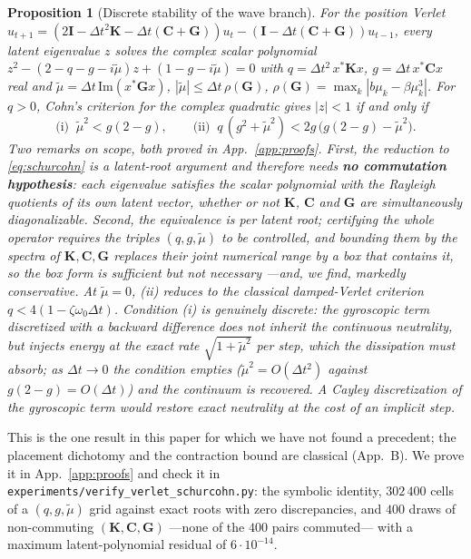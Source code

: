 \documentclass{article}
\newtheorem{proposition}{Proposition}
\begin{document}
\begin{proposition}[Discrete stability of the wave branch]
\label{prop:verlet}
For the position Verlet
$u_{t+1}=(2\mathbf{I}-\Delta t^2\mathbf{K}-\Delta t(\mathbf{C}+\mathbf{G}))u_t
-(\mathbf{I}-\Delta t(\mathbf{C}+\mathbf{G}))u_{t-1}$, every latent eigenvalue
$z$ solves the complex scalar polynomial
$z^2-(2-q-g-i\tilde\mu)z+(1-g-i\tilde\mu)=0$ with
$q=\Delta t^2\,x^*\mathbf{K}x$, $g=\Delta t\,x^*\mathbf{C}x$ real and
$\tilde\mu=\Delta t\,\mathrm{Im}(x^*\mathbf{G}x)$,
$|\tilde\mu|\le\Delta t\,\rho(\mathbf{G})$,
$\rho(\mathbf{G})=\max_k|b\mu_k-\beta\mu_k^3|$. For $q>0$, Cohn's criterion
for the complex quadratic gives $|z|<1$ \emph{if and only if}
\begin{equation}\label{eq:schurcohn}
\text{(i)}\;\;\tilde\mu^2< g(2-g),\qquad
\text{(ii)}\;\;q\,(g^2+\tilde\mu^2)< 2g\,\big(g(2-g)-\tilde\mu^2\big).
\end{equation}
Two remarks on scope, both proved in App.~\ref{app:proofs}. First, the
reduction to \eqref{eq:schurcohn} is a \emph{latent-root} argument and
therefore needs \textbf{no commutation hypothesis}: each eigenvalue satisfies
the scalar polynomial with the Rayleigh quotients of its own latent vector,
whether or not $\mathbf{K}$, $\mathbf{C}$ and $\mathbf{G}$ are simultaneously
diagonalizable. Second, the equivalence is per latent root; certifying the
whole operator requires the triples $(q,g,\tilde\mu)$ to be controlled, and
bounding them by the spectra of $\mathbf{K},\mathbf{C},\mathbf{G}$ replaces
their joint numerical range by a \emph{box} that contains it, so the box form
is sufficient but not necessary ---and, we find, markedly conservative.
At $\tilde\mu=0$, (ii) reduces to the classical damped-Verlet criterion
$q<4(1-\zeta\omega_0\Delta t)$. Condition (i) is \emph{genuinely discrete}: the
gyroscopic term discretized with a backward difference does not inherit the
continuous neutrality, but injects energy at the exact rate
$\sqrt{1+\tilde\mu^2}$ per step, which the dissipation must absorb; as
$\Delta t\to0$ the condition empties ($\tilde\mu^2=O(\Delta t^2)$ against
$g(2-g)=O(\Delta t)$) and the continuum is recovered. A Cayley discretization of
the gyroscopic term \citep{iserles2000lie} would restore exact neutrality at the
cost of an implicit step.
\end{proposition}

This is the one result in this paper for which we have not found a precedent;
the placement dichotomy and the contraction bound are classical (App.~B). We
prove it in App.~\ref{app:proofs} and check it in
\texttt{experiments/verify\_verlet\_schurcohn.py}: the symbolic identity, $302\,400$ cells
of a $(q,g,\tilde\mu)$ grid against exact roots with zero discrepancies, and
$400$ draws of non-commuting $(\mathbf{K},\mathbf{C},\mathbf{G})$ ---none of
the $400$ pairs commuted--- with a maximum latent-polynomial residual of
$6\cdot10^{-14}$.
\end{document}
